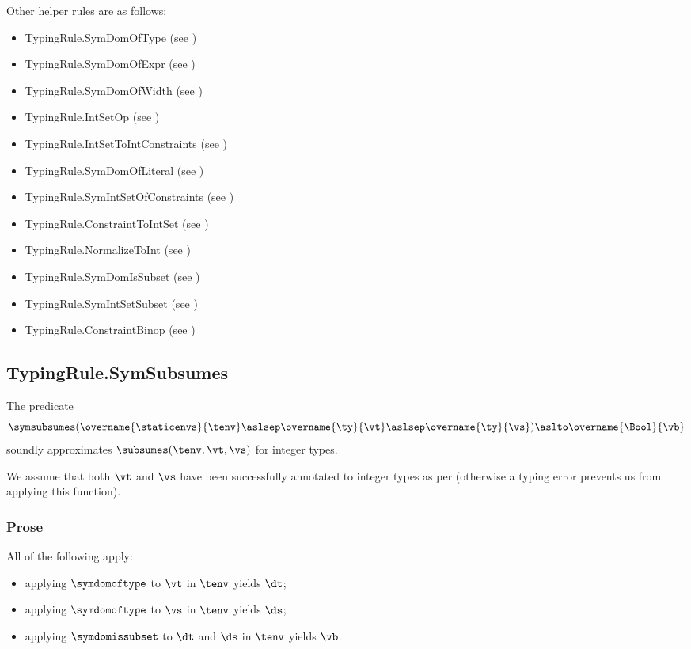 Other helper rules are as follows:
\begin{itemize}
  \item TypingRule.SymDomOfType (see )
  \item TypingRule.SymDomOfExpr (see )
  \item TypingRule.SymDomOfWidth (see )
  \item TypingRule.IntSetOp (see )
  \item TypingRule.IntSetToIntConstraints (see )
  \item TypingRule.SymDomOfLiteral (see )
  \item TypingRule.SymIntSetOfConstraints (see )
  \item TypingRule.ConstraintToIntSet (see )
  \item TypingRule.NormalizeToInt (see )
  \item TypingRule.SymDomIsSubset (see )
  \item TypingRule.SymIntSetSubset (see )
  \item TypingRule.ConstraintBinop (see )
\end{itemize}

\subsection{TypingRule.SymSubsumes \label{sec:TypingRule.SymSubsumes}}
\hypertarget{def-symsubsumes}{}
The predicate
\[
  \symsubsumes(\overname{\staticenvs}{\tenv} \aslsep \overname{\ty}{\vt} \aslsep \overname{\ty}{\vs})
  \aslto \overname{\Bool}{\vb}
\]
soundly approximates $\subsumes(\tenv, \vt, \vs)$ for integer types.
\ProseOtherwiseTypeError

We assume that both $\vt$ and $\vs$ have been successfully annotated to integer types as per 
(otherwise a typing error prevents us from applying this function).

\subsubsection{Prose}
All of the following apply:
\begin{itemize}
  \item applying $\symdomoftype$ to $\vt$ in $\tenv$ yields $\dt$;
  \item applying $\symdomoftype$ to $\vs$ in $\tenv$ yields $\ds$;
  \item applying $\symdomissubset$ to $\dt$ and $\ds$ in $\tenv$ yields $\vb$.
\end{itemize}

